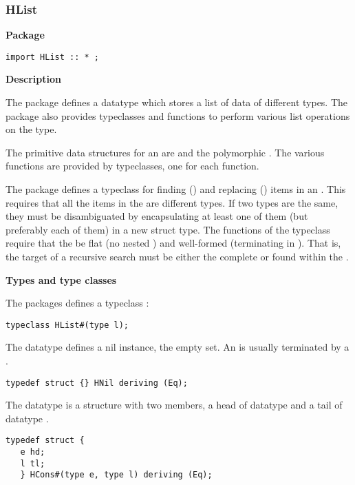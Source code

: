 \subsubsection{HList}

\label{sec-HList}

{\bf Package}

\begin{verbatim}
import HList :: * ;
\end{verbatim}


{\bf Description}

The  package defines a datatype  which 
stores a list of data of different types.   
The  package also provides typeclasses and functions to perform
various list  operations on the  type.

The primitive data structures for an  are   and the
polymorphic .  The various functions are provided by
typeclasses, one for each function.   

The package defines  a typeclass
 for finding () and replacing () items in
an .  This requires that all the items in the  are
different types.  If two types are the same, they must be
disambiguated by encapsulating at least one of them (but preferably
each of them) in a new struct type.  The functions of the
 typeclass require that the  be flat (no nested
) and well-formed (terminating in ).  That is, the
target of a recursive search must be either the complete  or
found within the .  

{\bf Types and type classes}


The  packages defines a typeclass :

\begin{verbatim}
typeclass HList#(type l); 
\end{verbatim} 


The  datatype defines a nil instance, the empty set.  An
 is usually terminated by a .

\begin{verbatim}
typedef struct {} HNil deriving (Eq);
\end{verbatim}

The  datatype is a structure with two members, a head of
datatype  and a tail of datatype .  

\begin{verbatim}
typedef struct {
   e hd;
   l tl;
   } HCons#(type e, type l) deriving (Eq);
\end{verbatim}


